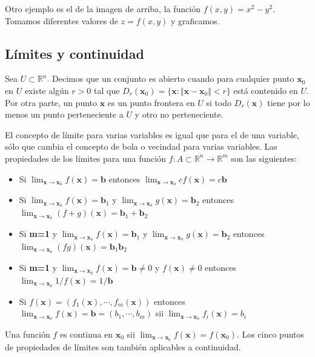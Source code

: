 \documentclass[a4paper]{article}
\begin{document}
Otro ejemplo es el de la imagen de arriba, la función $f(x,y) = x^2-y^2$. Tomamos diferentes valores de $z=f(x,y)$ y graficamos.

\subsection{Límites y continuidad}
Sea $U\subset\mathbb{R}^n$. Decimos que un conjunto es abierto cuando para cualquier punto $\textbf{x}_0$ en $U$ existe algún $r>0$ tal que $D_r(\textbf{x}_0) = \{\textbf{x}:\Vert\textbf{x}-\textbf{x}_0\Vert<r\}$ está contenido en $U$. Por otra parte, un punto $\textbf{x}$ es un punto frontera en $U$ si todo $D_r(\textbf{x})$ tiene por lo menos un punto perteneciente a $U$ y otro no perteneciente.

El concepto de límite para varias variables es igual que para el de una variable, sólo que cambia el concepto de bola o vecindad para varias variables. Las propiedades de los límites para una función $f:A\subset\mathbb{R}^n \rightarrow \mathbb{R}^m$ son las siguientes:
\begin{itemize}
	\item Si $\lim_{\textbf{x}\rightarrow\textbf{x}_0} f(\textbf{x}) = \textbf{b}$ entonces $\lim_{\textbf{x}\rightarrow\textbf{x}_0} cf(\textbf{x}) = c\textbf{b}$
	\item Si $\lim_{\textbf{x}\rightarrow\textbf{x}_0} f(\textbf{x}) = \textbf{b}_1$ y   $\lim_{\textbf{x}\rightarrow\textbf{x}_0}g(\textbf{x}) = \textbf{b}_2$ entonces $\lim_{\textbf{x}\rightarrow\textbf{x}_0} (f+g)(\textbf{x}) = \textbf{b}_1+\textbf{b}_2$
		\item Si\textbf{ m=1} y $\lim_{\textbf{x}\rightarrow\textbf{x}_0} f(\textbf{x}) = \textbf{b}_1$ y   $\lim_{\textbf{x}\rightarrow\textbf{x}_0}g(\textbf{x}) = \textbf{b}_2$ entonces $\lim_{\textbf{x}\rightarrow\textbf{x}_0} (fg)(\textbf{x}) = \textbf{b}_1\textbf{b}_2$
	\item Si\textbf{ m=1} y $\lim_{\textbf{x}\rightarrow\textbf{x}_0} f(\textbf{x}) = \textbf{b}\neq0$ y $f(\textbf{x})\neq0$ entonces $\lim_{\textbf{x}\rightarrow\textbf{x}_0} 1/f(\textbf{x}) = 1/\textbf{b}$
	\item Si $f(\textbf{x})=(f_1(\textbf{x}),\cdots,f_m(\textbf{x}))$ entonces $\lim_{\textbf{x}\rightarrow\textbf{x}_0}f(\textbf{x})=\textbf{b}=(b_1,\cdots,b_m)$ sii $\lim_{\textbf{x}\rightarrow\textbf{x}_0}f_i(\textbf{x})=b_i$
\end{itemize}

Una función $f$ es continua en $\textbf{x}_0$ sii $\lim_{\textbf{x}\rightarrow\textbf{x}_0}f(\textbf{x}) = f(\textbf{x}_0)$. Los cinco puntos de propiedades de límites son también aplicables a continuidad.
\end{document}
